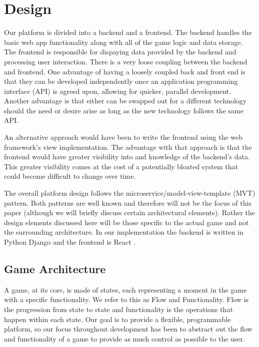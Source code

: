 \documentclass{article}
\begin{document}
\section{Design}
    Our platform is divided into a backend and a frontend. The backend handles the basic web app functionality along with all of the game logic and data storage. The frontend is responsible for dispaying data provided by the backend and processing user interaction. There is a very loose coupling between the backend and frontend. One advantage of having a loosely coupled back and front end is that they can be developed independently once an application programming interface (API) is agreed upon, allowing for quicker, parallel development. Another advantage is that either can be swapped out for a different technology should the need or desire arise as long as the new technology follows the same API.
    \smallskip
    
    An alternative approach would have been to write the frontend using the web framework's view implementation. The advantage with that approach is that the frontend would have greater visibility into and knowledge of the backend's data. This greater visibility comes at the cost of a potentially bloated system that could become difficult to change over time.
    \smallskip
    
    The overall platform design follows the microservice/model-view-template (MVT) pattern. Both patterns are well known and therefore will not be the focus of this paper (although we will briefly discuss certain architectural elements). Rather the design elements discussed here will be those specific to the actual game and not the surrounding architecture. In our implementation the backend is written in Python Django \cite{django} and the frontend is React \cite{react}.

	\subsection{Game Architecture}\label{architecture}
	    A game, at its core, is made of states, each representing a moment in the game with a specific functionality. We refer to this as Flow and Functionality. Flow is the progression from state to state and functionality is the operations that happen within each state. Our goal is to provide a flexible, programmable platform, so our focus throughout development has been to abstract out the flow and functionality of a game to provide as much control as possible to the user.
\end{document}
